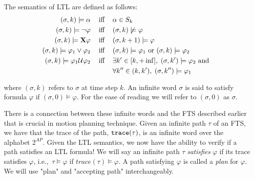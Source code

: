 \theoremstyle{definition}
\begin{definition}
\label{defLTLS}
The semantics of LTL are defined as follows:
\begin{align*}
(\sigma,k) \models \alpha \hspace{0.3cm}\text{ iff }\hspace{0.3cm}& \alpha \in S_k \\
(\sigma,k) \models \neg \varphi \hspace{0.3cm}\text{ iff }\hspace{0.3cm}& (\sigma, k) \not \models \varphi \\
(\sigma,k) \models \textbf{X} \varphi \hspace{0.3cm}\text{ iff }\hspace{0.3cm}& (\sigma, k+1) \models \varphi \\
(\sigma,k) \models \varphi_1 \lor \varphi_2 \hspace{0.3cm}\text{ iff }\hspace{0.3cm}& (\sigma,k) \models \varphi_1 \text{ or } (\sigma,k) \models \varphi_2 \\
(\sigma,k) \models \varphi_1 \mathcal{U} \varphi_2 \hspace{0.3cm}\text{ iff }\hspace{0.3cm}& \exists k' \in [k,+\inf ], \hspace{0.1cm} (\sigma ,k') \models \varphi_2 \text{ and } \\ &\forall k'' \in (k,k'), \hspace{0.1cm} (\sigma, k'') \models \varphi_1 
\end{align*}
\end{definition}
where $(\sigma,k)$ refers to $\sigma$ at time step $k$. An infinite word $\sigma$ is said to satisfy formula $\varphi$ if $(\sigma,0) \models \varphi$. For the ease of reading we will refer to $(\sigma,0)$ as $\sigma$. 

There is a connection between these infinite words and the FTS described earlier that is crucial in motion planning technique. Given an infinite path $\tau$ of an FTS, we have that the trace of the path, $\texttt{trace}(\tau)$, is an infinite word over the alphabet $2^{AP}$. Given the LTL semantics, we now have the ability to verify if a path satisfies an LTL formula! We will say an infinite path $\tau$ \textit{satisfies} $\varphi$ if its trace satisfies $\varphi$, i.e.,\ $\tau \models \varphi$ if $trace(\tau) \models \varphi$. A path satisfying $\varphi$ is called a \textit{plan} for $\varphi$. We will use "plan" and "accepting path" interchangeably.





